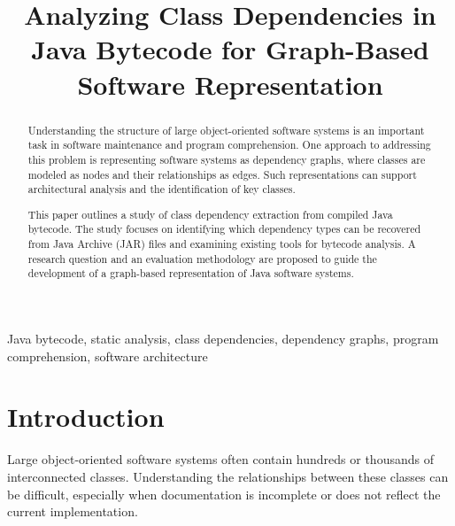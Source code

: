 \documentclass[conference]{IEEEtran}
\begin{document}
	
	\title{Analyzing Class Dependencies in Java Bytecode
		for Graph-Based Software Representation}
	
	\author{
	}
	
	\maketitle
	
	\begin{abstract}
		Understanding the structure of large object-oriented
		software systems is an important task in software
		maintenance and program comprehension. One approach
		to addressing this problem is representing software
		systems as dependency graphs, where classes are
		modeled as nodes and their relationships as edges.
		Such representations can support architectural analysis
		and the identification of key classes.
		
		This paper outlines a study of class dependency
		extraction from compiled Java bytecode. The study
		focuses on identifying which dependency types can
		be recovered from Java Archive (JAR) files and
		examining existing tools for bytecode analysis.
		A research question and an evaluation methodology
		are proposed to guide the development of a
		graph-based representation of Java software systems.
	\end{abstract}
	
	\begin{IEEEkeywords}
		Java bytecode, static analysis, class dependencies,
		dependency graphs, program comprehension,
		software architecture
	\end{IEEEkeywords}
	
	
	\section{Introduction}
	
	Large object-oriented software systems often contain
	hundreds or thousands of interconnected classes.
	Understanding the relationships between these
	classes can be difficult, especially when documentation
	is incomplete or does not reflect the current
	implementation.
	
\end{document}
